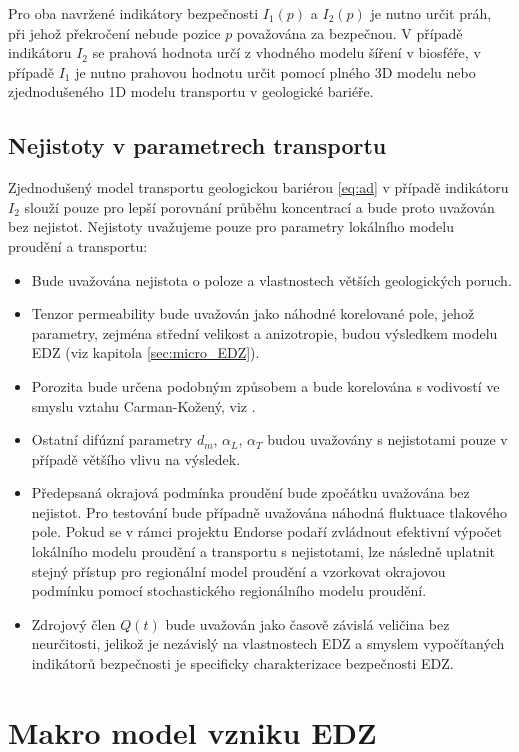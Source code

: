 \documentclass{article}
\begin{document}
Pro oba navržené indikátory bezpečnosti $I_1(p)$ a $I_2(p)$ je nutno určit práh, při jehož překročení nebude pozice $p$ považována za bezpečnou. V případě indikátoru $I_2$ se prahová hodnota určí z vhodného modelu šíření  v biosféře, v případě $I_1$ je nutno prahovou hodnotu určit pomocí plného 3D modelu nebo zjednodušeného 1D modelu transportu v geologické bariéře.



\subsection{Nejistoty v parametrech transportu}
\label{sec:nejistoty}
Zjednodušený model transportu geologickou bariérou \eqref{eq:ad} v případě indikátoru $I_2$ slouží pouze pro lepší porovnání průběhu koncentrací a bude proto uvažován bez nejistot. Nejistoty uvažujeme pouze pro parametry lokálního modelu proudění a transportu:
\begin{itemize}
 \item Bude uvažována nejistota o poloze a vlastnostech větších geologických poruch.
 \item Tenzor permeability bude uvažován jako náhodné korelované pole, jehož parametry, zejména střední velikost a anizotropie, budou 
 výsledkem modelu EDZ (viz kapitola \ref{sec:micro_EDZ}).
 \item Porozita bude určena podobným způsobem a bude korelována s vodivostí ve smyslu vztahu Carman-Kožený, viz \cite{Carrier2003}.
 \item Ostatní difúzní parametry $d_m$, $\alpha_L$, $\alpha_T$ budou uvažovány s nejistotami pouze v případě většího vlivu na výsledek.
 \item Předepsaná okrajová podmínka proudění bude zpočátku uvažována bez nejistot. Pro testování bude případně uvažována náhodná fluktuace tlakového pole. Pokud se v rámci projektu Endorse podaří zvládnout efektivní výpočet lokálního modelu proudění a transportu s nejistotami, lze následně uplatnit stejný přístup pro regionální model proudění a vzorkovat okrajovou podmínku pomocí stochastického regionálního modelu proudění.
 \item Zdrojový člen $Q(t)$ bude uvažován jako časově závislá veličina bez neurčitosti, jelikož 
 je nezávislý na vlastnostech EDZ a smyslem vypočítaných indikátorů bezpečnosti je specificky charakterizace bezpečnosti EDZ.
\end{itemize}

\section{Makro model vzniku EDZ}
\label{sec:model_EDZ}
\end{document}
